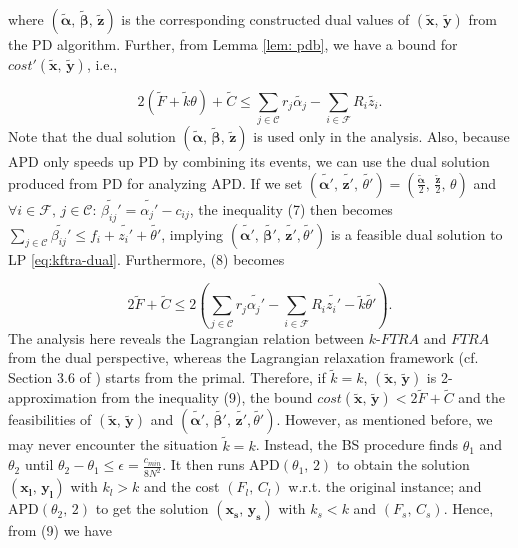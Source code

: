 \documentclass[10pt]{llncs}
\begin{document}
where $\left(\boldsymbol{\tilde{\alpha}},\,\boldsymbol{\tilde{\beta}},\,\boldsymbol{\tilde{z}}\right)$
is the corresponding constructed dual values of $\left(\boldsymbol{\tilde{x}},\,\boldsymbol{\tilde{y}}\right)$
from the PD algorithm. Further, from Lemma \ref{lem: pdb}, we have
a bound for $cost'\left(\boldsymbol{\tilde{x}},\,\boldsymbol{\tilde{y}}\right)$,
i.e.,

$ $
\begin{equation}
2\left(\tilde{F}+\tilde{k}\theta\right)+\tilde{C}\leq\sum_{j\in\mathcal{C}}r_{j}\tilde{\alpha_{j}}-\sum_{i\in\mathcal{F}}R_{i}\tilde{z_{i}}.
\end{equation}
Note that the dual solution $\left(\boldsymbol{\tilde{\alpha}},\,\boldsymbol{\tilde{\beta}},\,\boldsymbol{\tilde{z}}\right)$
is used only in the analysis. Also, because APD only speeds up PD
by combining its events, we can use the dual solution produced from
PD for analyzing APD. If we set $\left(\boldsymbol{\tilde{\alpha'}},\,\boldsymbol{\tilde{z'}},\,\tilde{\theta'}\right)=\left(\frac{\boldsymbol{\tilde{\alpha}}}{2},\,\frac{\boldsymbol{\tilde{z}}}{2},\,\theta\right)$
and $\forall i\in\mathcal{F},\, j\in\mathcal{C}:\,\tilde{\beta_{ij}'}=\tilde{\alpha_{j}'}-c_{ij}$,
the inequality (7) then becomes $\sum_{j\in\mathcal{C}}\tilde{\beta_{ij}'}\leq f_{i}+\tilde{z_{i}'}+\tilde{\theta'}$,
implying $\left(\boldsymbol{\tilde{\alpha'}},\,\boldsymbol{\tilde{\beta'}},\,\boldsymbol{\tilde{z'}},\tilde{\theta'}\right)$
is a feasible dual solution to LP \eqref{eq:kftra-dual}. Furthermore,
(8) becomes

\begin{equation}
2\tilde{F}+\tilde{C}\leq2\left(\sum_{j\in\mathcal{C}}r_{j}\tilde{\alpha_{j}'}-\sum_{i\in\mathcal{F}}R_{i}\tilde{z_{i}'}-\tilde{k}\tilde{\theta'}\right).
\end{equation}
The analysis here reveals the Lagrangian relation between $k$-$FTRA$
and $FTRA$ from the dual perspective, whereas the Lagrangian relaxation
framework (cf. Section 3.6 of \cite{jain01approximation}) starts
from the primal. Therefore, if $\tilde{k}=k$, $\left(\boldsymbol{\tilde{x}},\,\boldsymbol{\tilde{y}}\right)$
is 2-approximation from the inequality (9), the bound $cost\left(\boldsymbol{\tilde{x}},\,\boldsymbol{\tilde{y}}\right)<2\tilde{F}+\tilde{C}$
and the feasibilities of $\left(\boldsymbol{\tilde{x}},\,\boldsymbol{\tilde{y}}\right)$
and $\left(\boldsymbol{\tilde{\alpha'}},\,\boldsymbol{\tilde{\beta'}},\,\boldsymbol{\tilde{z'}},\tilde{\theta'}\right)$.
However, as mentioned before, we may never encounter the situation
$\tilde{k}=k$. Instead, the BS procedure finds $ $$\theta_{1}$
and $\theta_{2}$ until $\theta_{2}-\theta_{1}\leq\epsilon=\frac{c_{min}}{8N^{2}}$.
It then runs APD$\left(\theta_{1},\,2\right)$ to obtain the solution
$\left(\boldsymbol{x_{l}},\,\boldsymbol{y_{l}}\right)$ with $k_{l}>k$
and the cost $\left(F_{l},\, C_{l}\right)$ w.r.t. the original instance;
and APD$\left(\theta_{2},\,2\right)$ to get the solution $\left(\boldsymbol{x_{s}},\,\boldsymbol{y_{s}}\right)$
with $k_{s}<k$ and $\left(F_{s},\, C_{s}\right)$. Hence, from (9)
we have
\end{document}

